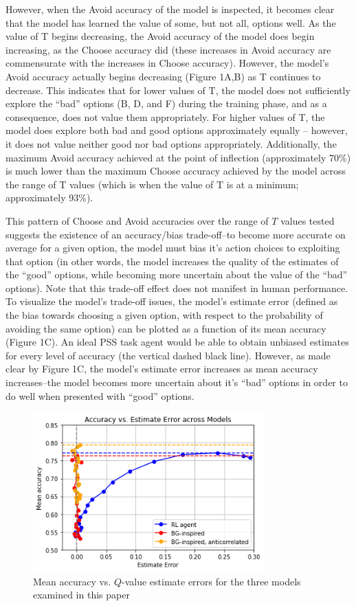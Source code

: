 \documentclass[10pt,letterpaper]{article}
\begin{document}
However, when the Avoid accuracy of the model is inspected, it becomes clear that the model has learned the value of some, but not all, options well. As the value of T begins decreasing, the Avoid accuracy of the model does begin increasing, as the Choose accuracy did (these increases in Avoid accuracy are commensurate with the increases in Choose  accuracy). However, the model’s Avoid accuracy actually begins decreasing (Figure 1A,B) as T continues to decrease. This indicates that for lower values of T, the model does not sufficiently explore the “bad” options (B, D, and F) during the training phase, and as a consequence, does not value them appropriately. For higher values of T, the model does explore both bad and good options approximately equally – however, it does not value neither good nor bad options appropriately. Additionally, the maximum Avoid accuracy achieved at the point of inflection (approximately 70\%) is much lower than the maximum Choose accuracy achieved by the model across the range of T values (which is when the value of T is at a minimum; approximately 93\%). 

This pattern of Choose and Avoid accuracies over the range of $T$ values tested suggests the existence of an accuracy/bias trade-off--to become more accurate on average for a given option, the model must bias it’s action choices to exploiting that option (in other words, the model increases the quality of the estimates of the ``good'' options, while becoming more uncertain about the value of the ``bad'' options). Note that this trade-off effect does not manifest in human performance. To visualize the model’s trade-off issues, the model’s estimate error (defined as the bias towards choosing a given option, with respect to the probability of avoiding the same option) can be plotted as a function of its mean accuracy (Figure 1C). An ideal PSS task agent would be able to obtain unbiased estimates for every level of accuracy (the vertical dashed black line). However, as made clear by Figure 1C, the model’s estimate error increases as mean accuracy increases--the model becomes more uncertain about it’s ``bad'' options in order to do well when presented with “good” options.

\begin{figure}[ht]
	\begin{center}
		\includegraphics[width=3.5in]{roc-agents.png}
	\end{center}
	\caption{Mean accuracy vs. $Q$-value estimate errors for the three models examined in this paper} 
	\label{pss}
\end{figure}
\end{document}
